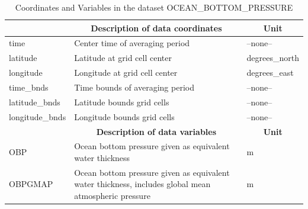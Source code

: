 \begin{longtable}{|m{}|m{}|m{}|}
\caption{Coordinates and Variables in the dataset OCEAN\_BOTTOM\_PRESSURE}
\label{tab:table-<xarray.Dataset> Size: 2MB
Dimensions:         (time: 1, latitude: 360, longitude: 720, nv: 2)
Coordinates:
  * time            (time) datetime64[ns] 8B 2017-12-29T12:00:00
  * latitude        (latitude) float32 1kB -89.75 -89.25 -88.75 ... 89.25 89.75
  * longitude       (longitude) float32 3kB -179.8 -179.2 -178.8 ... 179.2 179.8
    time_bnds       (time, nv) datetime64[ns] 16B ...
    latitude_bnds   (latitude, nv) float32 3kB ...
    longitude_bnds  (longitude, nv) float32 6kB ...
Dimensions without coordinates: nv
Data variables:
    OBP             (time, latitude, longitude) float32 1MB ...
    OBPGMAP         (time, latitude, longitude) float32 1MB ...
Attributes: (12/57)
    acknowledgement:              This research was carried out by the Jet Pr...
    author:                       Ian Fenty and Ou Wang
    cdm_data_type:                Grid
    comment:                      Fields provided on a regular lat-lon grid. ...
    Conventions:                  CF-1.8, ACDD-1.3
    coordinates_comment:          Note: the global 'coordinates' attribute de...
    ...                           ...
    time_coverage_duration:       P1D
    time_coverage_end:            2017-12-30T00:00:00
    time_coverage_resolution:     P1D
    time_coverage_start:          2017-12-29T00:00:00
    title:                        ECCO Ocean Bottom Pressure - Daily Mean 0.5...
    uuid:                         4bfbc7be-404b-11eb-b3f5-0cc47a3f7e1d-fields} \\ 
\hline \endhead \hline \endfoot
\rowcolor{lightgray} \multicolumn{1}{|c|}{\textbf{Coordinates}} & \multicolumn{1}{|c|}{\textbf{Description of data coordinates}} &  \multicolumn{1}{|c|}{\textbf{Unit}}\\ \hline
time &Center time of averaging period &--none--  \\ \hline
latitude &Latitude at grid cell center &degrees\_north  \\ \hline
longitude &Longitude at grid cell center &degrees\_east  \\ \hline
time\_bnds &Time bounds of averaging period &--none--  \\ \hline
latitude\_bnds &Latitude bounds grid cells &--none--  \\ \hline
longitude\_bnds &Longitude bounds grid cells &--none--  \\ \hline
\rowcolor{lightgray} \multicolumn{1}{|c|}{\textbf{Variables}} & \multicolumn{1}{|c|}{\textbf{Description of data variables}} &  \multicolumn{1}{|c|}{\textbf{Unit}}\\ \hline
OBP &Ocean bottom pressure given as equivalent water thickness &m  \\ \hline
OBPGMAP &Ocean bottom pressure given as equivalent water thickness, includes global mean atmospheric pressure &m  \\ \hline
\end{longtable}

